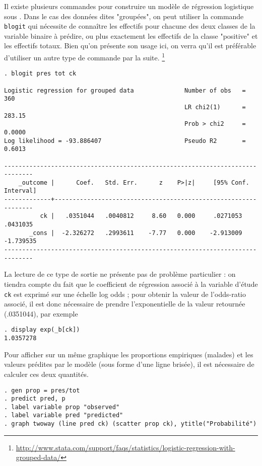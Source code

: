Il existe plusieurs commandes pour construire un modèle de régression
logistique sous \Stata. Dans le cas des données dites "groupées", on peut
utiliser la commande \texttt{blogit} qui nécessite de connaître les
effectifs pour chacune des deux classes de la variable binaire à prédire, ou
plus exactement les effectifs de la classe "positive" et les effectifs
totaux. Bien qu'on présente son usage ici, on verra qu'il est préférable
d'utiliser un autre type de commande par la suite.
\footnote{\url{http://www.stata.com/support/faqs/statistics/logistic-regression-with-grouped-data/}}
\begin{verbatim}
. blogit pres tot ck

Logistic regression for grouped data              Number of obs   =        360
                                                  LR chi2(1)      =     283.15
                                                  Prob > chi2     =     0.0000
Log likelihood = -93.886407                       Pseudo R2       =     0.6013

------------------------------------------------------------------------------
    _outcome |      Coef.   Std. Err.      z    P>|z|     [95% Conf. Interval]
-------------+----------------------------------------------------------------
          ck |   .0351044   .0040812     8.60   0.000     .0271053    .0431035
       _cons |  -2.326272   .2993611    -7.77   0.000    -2.913009   -1.739535
------------------------------------------------------------------------------
\end{verbatim}
La lecture de ce type de sortie ne présente pas de problème particulier : on
tiendra compte du fait que le coefficient de régression associé à la
variable d'étude \texttt{ck} est exprimé sur une échelle log odds ; pour
obtenir la valeur de l'odds-ratio associé, il est donc nécessaire de prendre
l'exponentielle de la valeur retournée (.0351044), par exemple
\begin{verbatim}
. display exp(_b[ck])
1.0357278
\end{verbatim}

Pour afficher sur un même graphique les proportions empiriques (malades) et
les valeurs prédites par le modèle (sous forme d'une ligne brisée), il est
nécessaire de calculer ces deux quantités.
\begin{verbatim}
. gen prop = pres/tot
. predict pred, p
. label variable prop "observed"
. label variable pred "predicted"
. graph twoway (line pred ck) (scatter prop ck), ytitle("Probabilité")
\end{verbatim}

